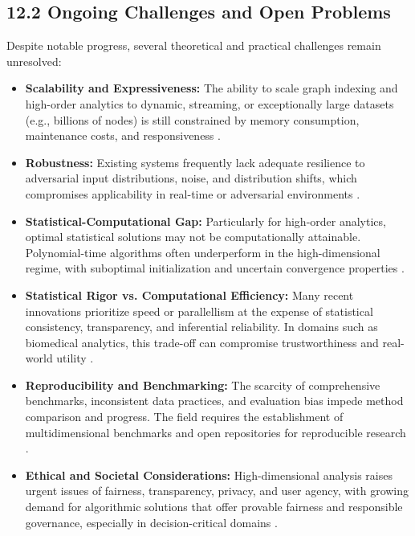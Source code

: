 \documentclass[11pt]{article}
\begin{document}
\subsection{12.2 Ongoing Challenges and Open Problems}

Despite notable progress, several theoretical and practical challenges remain unresolved:

\begin{itemize}
    \item \textbf{Scalability and Expressiveness:} The ability to scale graph indexing and high-order analytics to dynamic, streaming, or exceptionally large datasets (e.g., billions of nodes) is still constrained by memory consumption, maintenance costs, and responsiveness \cite{ref104,ref107}.
    \item \textbf{Robustness:} Existing systems frequently lack adequate resilience to adversarial input distributions, noise, and distribution shifts, which compromises applicability in real-time or adversarial environments \cite{ref106}.
    \item \textbf{Statistical-Computational Gap:} Particularly for high-order analytics, optimal statistical solutions may not be computationally attainable. Polynomial-time algorithms often underperform in the high-dimensional regime, with suboptimal initialization and uncertain convergence properties \cite{ref110}.
    \item \textbf{Statistical Rigor vs. Computational Efficiency:} Many recent innovations prioritize speed or parallellism at the expense of statistical consistency, transparency, and inferential reliability. In domains such as biomedical analytics, this trade-off can compromise trustworthiness and real-world utility \cite{ref110,ref116}.
    \item \textbf{Reproducibility and Benchmarking:} The scarcity of comprehensive benchmarks, inconsistent data practices, and evaluation bias impede method comparison and progress. The field requires the establishment of multidimensional benchmarks and open repositories for reproducible research \cite{ref116}.
    \item \textbf{Ethical and Societal Considerations:} High-dimensional analysis raises urgent issues of fairness, transparency, privacy, and user agency, with growing demand for algorithmic solutions that offer provable fairness and responsible governance, especially in decision-critical domains \cite{ref117,ref118}.
\end{itemize}
\end{document}
